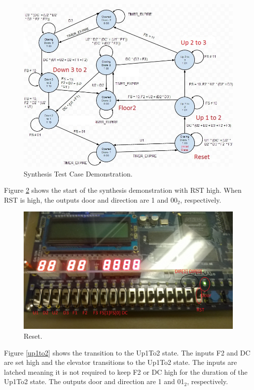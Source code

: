 \documentclass[journal]{IEEEtran}
\begin{document}
\begin{figure}[h]
\centering
\includegraphics[width=0.9\linewidth]{Synth_State_Machine.jpg}
\caption{Synthesis Test Case Demonstration.}
\label{synth_state_machine}
\end{figure}

Figure \ref{reset} shows the start of the synthesis demonstration with RST high. When RST is high, the outputs door and direction are 1 and 00$_{2}$, respectively. 

\begin{figure}[h]
\centering
\includegraphics[width=0.9\linewidth]{Reset.jpg}
\caption{Reset.}
\label{reset}
\end{figure}

Figure \ref{up1to2} shows the transition to the Up1To2 state. The inputs F2 and DC are set high and the elevator transitions to the Up1To2 state. The inputs are latched meaning it is not required to keep F2 or DC high for the duration of the Up1To2 state. The outputs door and direction are 1 and 01$_{2}$, respectively. 
\end{document}
